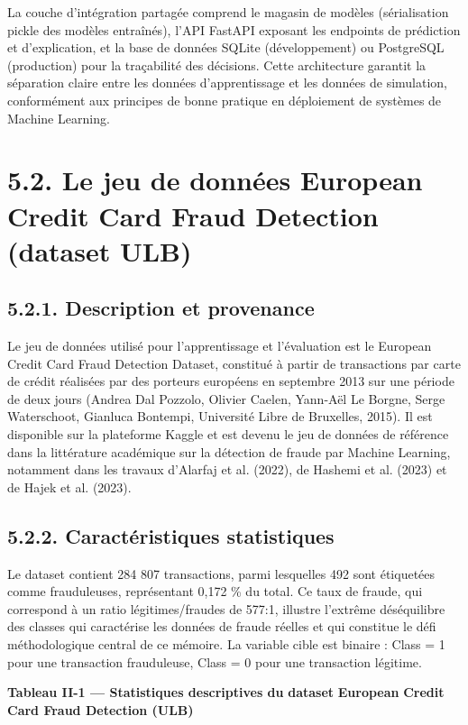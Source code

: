 La couche d'intégration partagée comprend le magasin de modèles (sérialisation pickle des modèles entraînés), l'API FastAPI exposant les endpoints de prédiction et d'explication, et la base de données SQLite (développement) ou PostgreSQL (production) pour la traçabilité des décisions. Cette architecture garantit la séparation claire entre les données d'apprentissage et les données de simulation, conformément aux principes de bonne pratique en déploiement de systèmes de Machine Learning.

\section{5.2. Le jeu de données European Credit Card Fraud Detection (dataset ULB)}

\subsection{5.2.1. Description et provenance}

Le jeu de données utilisé pour l'apprentissage et l'évaluation est le European Credit Card Fraud Detection Dataset, constitué à partir de transactions par carte de crédit réalisées par des porteurs européens en septembre 2013 sur une période de deux jours (Andrea Dal Pozzolo, Olivier Caelen, Yann-Aël Le Borgne, Serge Waterschoot, Gianluca Bontempi, Université Libre de Bruxelles, 2015). Il est disponible sur la plateforme Kaggle et est devenu le jeu de données de référence dans la littérature académique sur la détection de fraude par Machine Learning, notamment dans les travaux d'Alarfaj et al. (2022), de Hashemi et al. (2023) et de Hajek et al. (2023).

\subsection{5.2.2. Caractéristiques statistiques}

Le dataset contient 284 807 transactions, parmi lesquelles 492 sont étiquetées comme frauduleuses, représentant 0,172 \% du total. Ce taux de fraude, qui correspond à un ratio légitimes/fraudes de 577:1, illustre l'extrême déséquilibre des classes qui caractérise les données de fraude réelles et qui constitue le défi méthodologique central de ce mémoire. La variable cible est binaire : Class = 1 pour une transaction frauduleuse, Class = 0 pour une transaction légitime.

\textbf{Tableau II-1 — Statistiques descriptives du }\textbf{dataset}\textbf{ }\textbf{European}\textbf{ Credit Card Fraud Detection (ULB)}

